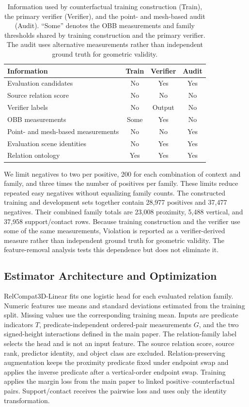 \begin{table}[t]
\centering
{\small
\setlength{\tabcolsep}{2.5pt}
\begin{tabularx}{\columnwidth}{@{}>{\raggedright\arraybackslash}Xccc@{}}
\toprule
Information & Train & Verifier & Audit \\
\midrule
Evaluation candidates & No & Yes & Yes \\
Source relation score & No & No & No \\
Verifier labels & No & Output & No \\
OBB measurements & Some & Yes & No \\
Point- and mesh-based measurements & No & No & Yes \\
Evaluation scene identities & No & Yes & Yes \\
Relation ontology & Yes & Yes & Yes \\
\bottomrule
\end{tabularx}
}
\caption{Information used by counterfactual training construction (Train), the primary verifier (Verifier), and the point- and mesh-based audit (Audit). ``Some'' denotes the OBB measurements and family thresholds shared by training construction and the primary verifier. The audit uses alternative measurements rather than independent ground truth for geometric validity.}
\label{tab:construct-dependence}
\end{table}

We limit negatives to two per positive, 200 for each combination of context and family, and three times the number of positives per family. These limits reduce repeated easy negatives without equalizing family counts. The constructed training and development sets together contain 28,977 positives and 37,477 negatives. Their combined family totals are 23,008 proximity, 5,488 vertical, and 37,958 support/contact rows. Because training construction and the verifier use some of the same measurements, Violation is reported as a verifier-derived measure rather than independent ground truth for geometric validity. The feature-removal analysis tests this dependence but does not eliminate it.

\subsection{Estimator Architecture and Optimization}
RelCompat3D-Linear fits one logistic head for each evaluated relation family. Numeric features use means and standard deviations estimated from the training split.
Missing values use the corresponding training mean. Inputs are predicate indicators $T$, predicate-independent ordered-pair measurements $G$, and the two signed-height interactions defined in the main paper. The relation-family label selects the head and is not an input feature. The source relation score, source rank, predictor identity, and object class are excluded. Relation-preserving augmentation keeps the proximity predicate fixed under endpoint swap and applies the inverse predicate after a vertical-order endpoint swap. Training applies the margin loss from the main paper to linked positive--counterfactual pairs. Support/contact receives the pairwise loss and uses only the identity transformation.

